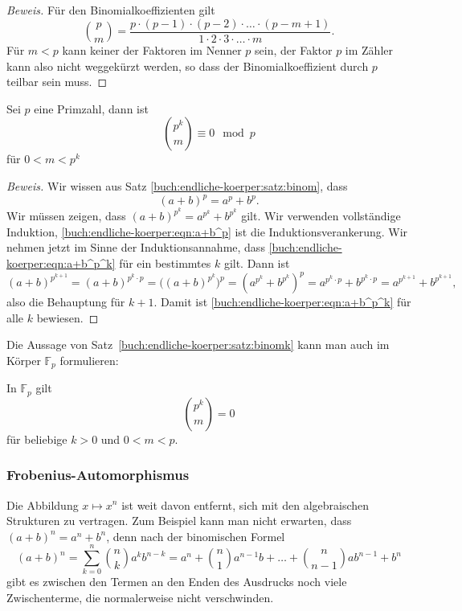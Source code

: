 \begin{proof}[Beweis]
Für den Binomialkoeffizienten gilt
\[
\binom{p}{m}
=
\frac{p\cdot (p-1)\cdot(p-2)\cdot\ldots\cdot (p-m+1)}{1\cdot 2\cdot 3\cdot\ldots\cdot m}.
\]
Für $m<p$ kann keiner der Faktoren im Nenner $p$ sein, der Faktor $p$
im Zähler kann also nicht weggekürzt werden, so dass der Binomialkoeffizient
durch $p$ teilbar sein muss.
\end{proof}

\begin{satz}
\label{buch:endliche-koerper:satz:binomk}
Sei $p$ eine Primzahl, dann ist
\begin{equation}
\binom{p^k}{m} \equiv 0\mod p
\label{buch:endliche-koerper:eqn:a+b^p^k}
\end{equation}
für $0<m<p^k$
\end{satz}

\begin{proof}[Beweis]
Wir wissen aus Satz \ref{buch:endliche-koerper:satz:binom}, dass 
\begin{equation}
(a+b)^p = a^p+b^p.
\label{buch:endliche-koerper:eqn:a+b^p}
\end{equation}
Wir müssen zeigen, dass $(a+b)^{p^k}=a^{p^k}+b^{p^k}$ gilt.
Wir verwenden vollständige Induktion, 
\eqref{buch:endliche-koerper:eqn:a+b^p} ist die Induktionsverankerung.
Wir nehmen jetzt im Sinne der Induktionsannahme, dass
\eqref{buch:endliche-koerper:eqn:a+b^p^k} für ein bestimmtes $k$ gilt.
Dann ist
\[
(a+b)^{p^{k+1}}
=
(a+b)^{p^k\cdot p}
=
\bigl((a+b)^{p^k}\bigr)^p
=
(a^{p^k}+b^{p^k})^p
=
a^{p^k\cdot p}+b^{p^k\cdot p}
=
a^{p^{k+1}}
+
b^{p^{k+1}},
\]
also die Behauptung für $k+1$.
Damit ist
\eqref{buch:endliche-koerper:eqn:a+b^p^k} für alle $k$ bewiesen.
\end{proof}

Die Aussage von Satz~\ref{buch:endliche-koerper:satz:binomk} kann man 
auch im Körper $\mathbb{F}_p$ formulieren:

\begin{satz}
\label{buch:endliche-koerper:satz:binomFp}
In $\mathbb{F}_p$ gilt
\[
\binom{p^k}{m}=0
\]
für beliebige $k>0$ und $0<m<p$.
\end{satz}

\subsubsection{Frobenius-Automorphismus}
Die Abbildung $x\mapsto x^n$ ist weit davon entfernt, sich mit den
algebraischen Strukturen zu vertragen.
Zum Beispiel kann man nicht erwarten, dass $(a+b)^n = a^n + b^n$,
denn nach der binomischen Formel
\begin{equation}
(a+b)^n
=
\sum_{k=0}^n \binom{n}{k} a^k b^{n-k}
=
a^n + \binom{n}{1}a^{n-1}b + \dots + \binom{n}{n-1}ab^{n-1} + b^n
\label{buch:endliche-koerper:fig:binomischeformel}
\end{equation}
gibt es zwischen den Termen an den Enden des Ausdrucks noch viele
Zwischenterme, die normalerweise nicht verschwinden.

